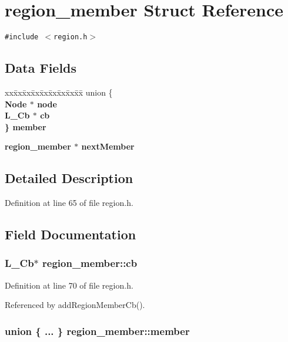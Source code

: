 \section{region\_\-member Struct Reference}
\label{structregion__member}
{\tt \#include $<$region.h$>$}

\subsection*{Data Fields}
\begin{CompactItemize}
\item 
\begin{tabbing}
xx\=xx\=xx\=xx\=xx\=xx\=xx\=xx\=xx\=\kill
union \{\\
\>\bf{Node} $\ast$ \bf{node}\\
\>L\_Cb $\ast$ \bf{cb}\\
\} \bf{member}\\

\end{tabbing}\item 
\bf{region\_\-member} $\ast$ \bf{next\-Member}
\end{CompactItemize}


\subsection{Detailed Description}




Definition at line 65 of file region.h.

\subsection{Field Documentation}
\subsubsection{\setlength{\rightskip}{0pt plus 5cm}L\_\-Cb$\ast$ \bf{region\_\-member::cb}}\label{structregion__member_5a8639ea2afc494285379a91a37d1e6b}




Definition at line 70 of file region.h.

Referenced by add\-Region\-Member\-Cb().
\subsubsection{\setlength{\rightskip}{0pt plus 5cm}union \{ ... \} 
   \bf{region\_\-member::member}}\label{structregion__member_8ba500b6eed754baa255b4785eed8aaf}




